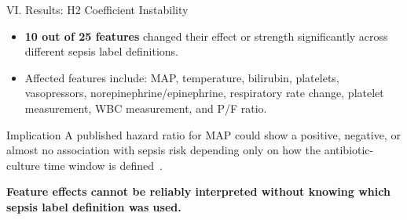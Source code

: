 \begin{frame}{VI. Results: H2 Coefficient Instability \confirmed}
\begin{itemize}
  \item \textbf{10 out of 25 features} changed their effect or strength
        significantly across different sepsis label definitions.
  \item Affected features include: MAP, temperature, bilirubin, platelets,
        vasopressors, norepinephrine/epinephrine, respiratory rate change,
        platelet measurement, WBC measurement, and P/F ratio.
\end{itemize}

\vspace{6pt}
\begin{block}{Implication}
  A published hazard ratio for MAP could show a positive, negative, or
  almost no association with sepsis risk depending only on how the
  antibiotic-culture time window is defined~\cite{lauritsen2021framing}.
\end{block}

\vspace{6pt}
\textbf{Feature effects cannot be reliably interpreted without knowing which
sepsis label definition was used.}
\end{frame}


